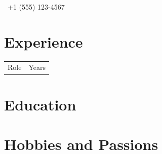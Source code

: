 \documentclass{deedy-resume-openfont}
\begin{document}
\faPhone\ +1 (555) 123-4567
\section{Experience}
\begin{tabular}{ll}
Role & Years \\
\end{tabular}
\section{Education}
\section{Hobbies and Passions}
\end{document}
